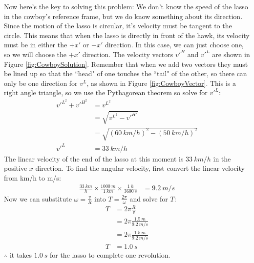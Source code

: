 \begin{enumerate}[label=\alph*)]
Now here's the key to solving this problem: We don't know the speed of the lasso in the cowboy's reference frame, but we do know something about its direction. Since the motion of the lasso is circular, it's velocity must be tangent to the circle. This means that when the lasso is directly in front of the hawk, its velocity must be in either the $+x'$ or $-x'$ direction. In this case, we can just choose one, so we will choose the $+x'$ direction.
The velocity vectors $v'^H$ and $v'^L$ are shown in Figure \ref{fig:CowboySolution}. Remember that when we add two vectors they must be lined up so that the ``head" of one touches the ``tail" of the other, so there can only be one direction for $v^L$, as shown in Figure \ref{fig:CowboyVector}. 
This is a right angle triangle, so we use the Pythagorean theorem so solve for $v'^L$:
\begin{align*}
v'^{L^2}+v'^{H^2}&=v^{L^2}\\
&=\sqrt{v^{L^2}-v'^{H^2}}\\
&=\sqrt{(\SI{60}{km/h})^2-(\SI{50}{km/h})^2}\\
v'^L&=\SI{33}{km/h}
\end{align*}
The linear velocity of the end of the lasso at this moment is $\SI{33}{km/h}$ in the positive $x$ direction.  To find the angular velocity, first convert the linear velocity from km/h to m/s:
\begin{align*}
\frac{\SI{33}{km}}{h}\times \frac{\SI{1000}{m}}{\SI{1}{km}} \times \frac{\SI{1}{h}}{\SI{3600}{s}} &= \SI{9.2}{m/s}
\end{align*}     
Now we can substitute $\omega=\frac{v}{R}$ into $T=\frac{2\pi}{\omega}$ and solve for $T$:
\begin{align*}
T&={2\pi}\frac{R}{v}\\
&={2\pi}\frac{\SI{1.5}{m}}{\SI{9.2}{m/s}}\\
&={2\pi}\frac{\SI{1.5}{m}}{\SI{9.2}{m/s}}\\
T&=\SI{1.0}{s}
\end{align*}
$\therefore$ it takes $\SI{1.0}{s}$ for the lasso to complete one revolution.

\end{enumerate}
